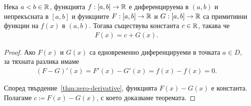 \documentclass[numbers=endperiod, bibliography=totocnumbered]{scrartcl}
\begin{document}
\begin{theorem}
Нека \( a < b \in \mathbb{R} \), функцията \( f: [a, b] \to \mathbb{R} \) е диференцируема в \( (a, b) \) и непрекъсната в \( [a, b] \) и функциите \( F: [a, b] \to \mathbb{R} \) и \( G: [a, b] \to \mathbb{R} \) са примитивни функции на \( f(x) \) в \( (a, b) \). Тогава съществува константа \( c \in \mathbb{R} \), такава че
  \begin{align*}
    F(x) = c + G(x).
  \end{align*}
\end{theorem}
\begin{proof}
  Ако \( F(x) \) и \( G(x) \) са едновременно диференцируеми в точката \( a \in D \), за тяхната разлика имаме
  \begin{align*}
    (F - G)'(x)
    =
    F'(x) - G'(x)
    =
    f(x) - f(x)
    =
    0.
  \end{align*}

  Според твърдение~\ref{thm:zero-derivative}, функцията \( F(x) - G(x) \) е константа. Полагаме \( c \coloneqq F(x) - G(x) \), с което доказваме теоремата.
\end{proof}

\printbibliography
\end{document}
